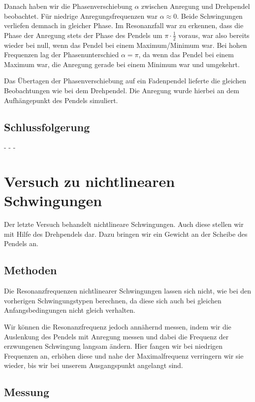 \documentclass[11pt,a4paper,titlepage, ngerman]{article}
\begin{document}
			Danach haben wir die Phasenverschiebung $\alpha$ zwischen Anregung und Drehpendel beobachtet. Für niedrige Anregungsfrequenzen war $\alpha \approx 0$. Beide Schwingungen verliefen demnach in gleicher Phase. Im Resonanzfall war zu erkennen, dass die Phase der Anregung stets der Phase des Pendels um $\pi\cdot\frac{1}{2}$ voraus, war also bereits wieder bei null, wenn das Pendel bei einem Maximum/Minimum war. Bei hohen Frequenzen lag der Phasenunterschied $\alpha = \pi$, da wenn das Pendel bei einem Maximum war, die Anregung gerade bei einem Minimum war und umgekehrt.
			
			Das Übertagen der Phasenverschiebung auf ein Fadenpendel lieferte die gleichen Beobachtungen wie bei dem Drehpendel. Die Anregung wurde hierbei an dem Aufhängepunkt des Pendels simuliert.   
			
		\subsection*{Schlussfolgerung}
			
			- - -
			
	\section{Versuch zu nichtlinearen Schwingungen}
	
		Der letzte Versuch behandelt nichtlineare Schwingungen. Auch diese stellen wir mit Hilfe des Drehpendels dar. Dazu bringen wir ein Gewicht an der Scheibe des Pendels an.
		
		\subsection*{Methoden}
				
			Die Resonanzfrequenzen nichtlinearer Schwingungen lassen sich nicht, wie bei den vorherigen Schwingungstypen berechnen, da diese sich auch bei gleichen Anfangsbedingungen nicht gleich verhalten.
			
			Wir können die Resonanzfrequenz jedoch annähernd messen, indem wir die Auslenkung des Pendels mit Anregung messen und dabei die Frequenz der erzwungenen Schwingung langsam ändern.
			Hier fangen wir bei niedrigen Frequenzen an, erhöhen diese und nahe der Maximalfrequenz verringern wir sie wieder, bis wir bei unserem Ausgangspunkt angelangt sind.
		
		\subsection*{Messung}
			
\end{document}
